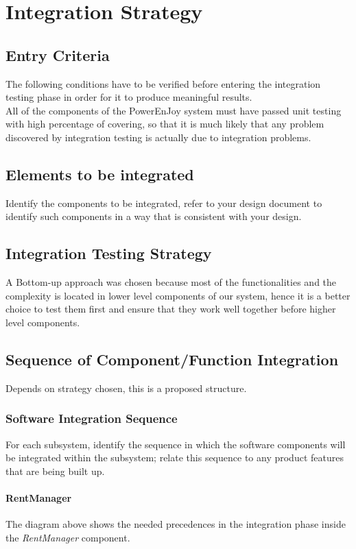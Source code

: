 \section{Integration Strategy}

\subsection{Entry Criteria}
The following conditions have to be verified before entering the integration testing phase in order for it to produce meaningful results.\\
All of the components of the PowerEnJoy system must have passed unit testing with high percentage of covering, so that it is much likely that any problem discovered by integration testing is actually due to integration problems.

\subsection{Elements to be integrated}
Identify the components to be integrated, refer to your design document to identify such components in a way that is consistent with your design.

\subsection{Integration Testing Strategy}
A Bottom-up approach was chosen because most of the functionalities and the complexity is located in lower level components of our system, hence it is a better choice to test them first and ensure that they work well together before higher level components.

\subsection{Sequence of Component/Function Integration}
Depends on strategy chosen, this is a proposed structure.

\subsubsection{Software Integration Sequence}
For each subsystem, identify the sequence in which the software components will be integrated within the subsystem; relate this sequence to any product features that are being built up.

\paragraph{RentManager} 
The diagram above shows the needed precedences in the integration phase inside the \emph{RentManager} component.
